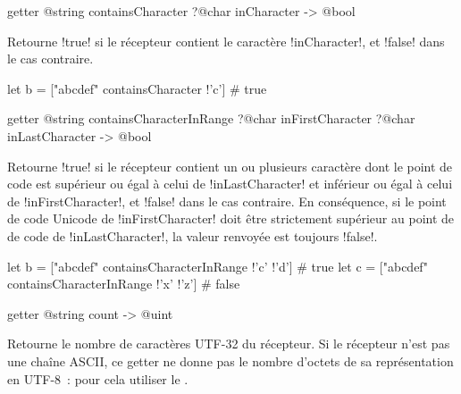 
\begin{galgas3box}
getter @string containsCharacter ?@char inCharacter -> @bool
\end{galgas3box}
Retourne \ggst!true! si le récepteur contient le caractère \ggst!inCharacter!, et \ggst!false! dans le cas contraire.

\begin{galgas3}
let b = ["abcdef" containsCharacter !'c'] # true
\end{galgas3}






\begin{galgas3box}
getter @string containsCharacterInRange
  ?@char inFirstCharacter
  ?@char inLastCharacter
  -> @bool
\end{galgas3box}

Retourne \ggst!true! si le récepteur contient un ou plusieurs caractère dont le point de code est supérieur ou égal à celui de \ggst!inLastCharacter! et inférieur ou égal à celui de \ggst!inFirstCharacter!, et \ggst!false! dans le cas contraire. En conséquence, si le point de code Unicode de \ggst!inFirstCharacter! doit être strictement supérieur au point de de code de \ggst!inLastCharacter!, la valeur renvoyée est toujours \ggst!false!.

\begin{galgas3}
let b = ["abcdef" containsCharacterInRange !'c' !'d'] # true
let c = ["abcdef" containsCharacterInRange !'x' !'z'] # false
\end{galgas3}









\begin{galgas3box}
getter @string count -> @uint
\end{galgas3box}

Retourne le nombre de caractères UTF-32 du récepteur. Si le récepteur n'est pas une chaîne ASCII, ce getter ne donne pas le nombre d'octets de sa représentation en UTF-8~: pour cela utiliser le .









